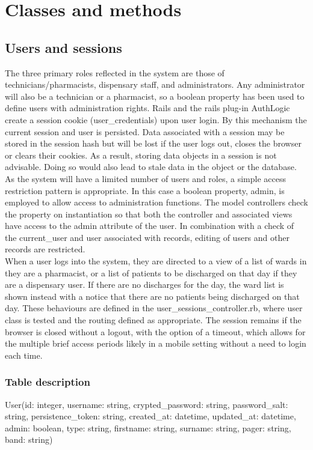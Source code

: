 \documentclass[letterpaper]{amsart}
\begin{document}
\section{Classes and methods}
\subsection{Users and sessions} 
The three primary roles reflected in the system are those of technicians/pharmacists, dispensary staff, and administrators.  Any administrator will also be a technician or a pharmacist, so a boolean property has been used to define users with administration rights.  Rails and the rails plug-in AuthLogic create a session cookie (user\_credentials) upon user login.  By this mechanism the current session and user is persisted.  Data associated with a session may be stored in the session hash but will be lost if the user logs out, closes the browser or clears their cookies.  As a result, storing data objects in a session is not advisable.  Doing so would also lead to stale data in the object or the database.\\
As the system will have a limited number of users and roles, a simple access restriction pattern is appropriate.  In this case a boolean property, admin, is employed to allow access to administration functions.  The model controllers check the property on instantiation so that both the controller and associated views have access to the admin attribute of the user.  In combination with a check of the current\_user and user associated with records, editing of users and other records are restricted.\\
When a user logs into the system, they are directed to a view of a list of wards in they are a pharmacist, or a list of patients to be discharged on that day if they are a dispensary user.  If there are no discharges for the day, the ward list is shown instead with a notice that there are no patients being discharged on that day.  These behaviours are defined in the user\_sessions\_controller.rb, where user class is tested and the routing defined as appropriate.  The session remains if the browser is closed without a logout, with the option of a timeout, which allows for the multiple brief access periods likely in a mobile setting without a need to login each time.
\subsubsection{Table description}
User(id: integer, username: string, crypted\_password: string, password\_salt: string, persistence\_token: string, created\_at: datetime, updated\_at: datetime, admin: boolean, type: string, firstname: string, surname: string, pager: string, band: string)
\end{document}
